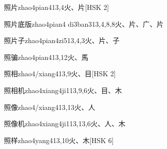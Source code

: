 \begin{EntryWithPhonetic}{照片}{zhao4pian4}{13,4}{⽕、⽚}[HSK 2]
\end{EntryWithPhonetic}

\begin{EntryWithPhonetic}{照片底版}{zhao4pian4 di3ban3}{13,4,8,8}{⽕、⽚、⼴、⽚}
\end{EntryWithPhonetic}

\begin{EntryWithPhonetic}{照片子}{zhao4pian4zi5}{13,4,3}{⽕、⽚、⼦}
\end{EntryWithPhonetic}

\begin{EntryWithPhonetic}{照骗}{zhao4pian4}{13,12}{⽕、⾺}
\end{EntryWithPhonetic}

\begin{EntryWithPhonetic}{照相}{zhao4/xiang4}{13,9}{⽕、⽬}[HSK 2]
\end{EntryWithPhonetic}

\begin{EntryWithPhonetic}{照相机}{zhao4xiang4ji1}{13,9,6}{⽕、⽬、⽊}
\end{EntryWithPhonetic}

\begin{EntryWithPhonetic}{照像}{zhao4/xiang4}{13,13}{⽕、⼈}
\end{EntryWithPhonetic}

\begin{EntryWithPhonetic}{照像机}{zhao4xiang4ji1}{13,13,6}{⽕、⼈、⽊}
\end{EntryWithPhonetic}

\begin{EntryWithPhonetic}{照样}{zhao4yang4}{13,10}{⽕、⽊}[HSK 6]
\end{EntryWithPhonetic}


